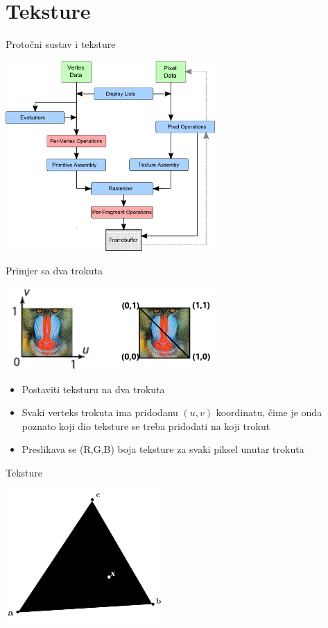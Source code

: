 \documentclass[9pt]{beamer}
\begin{document}
\section{Teksture}
\begin{frame}{Protočni sustav i teksture}
	\begin{center}
		\includegraphics[width=8cm]{./slike/graphics_pipeline_06.png}
	\end{center}
\end{frame}

\begin{frame}{Primjer sa dva trokuta}
	\begin{center}
		\includegraphics[width=8cm]{slike/baboon.png}
	\end{center}
	\begin{itemize}
		\item Postaviti teksturu na dva trokuta
		\item  Svaki verteks trokuta ima pridodanu $(u,v)$ koordinatu, čime je onda poznato koji dio teksture se treba pridodati na koji trokut
		\item Preslikava se (R,G,B) boja teksture za svaki piksel unutar trokuta
	\end{itemize}
\end{frame}

\begin{frame}{Teksture}
	\begin{center}
		\includegraphics[width=6cm]{./slike/slide_023.jpg}
	\end{center}
\end{frame}
\end{document}
